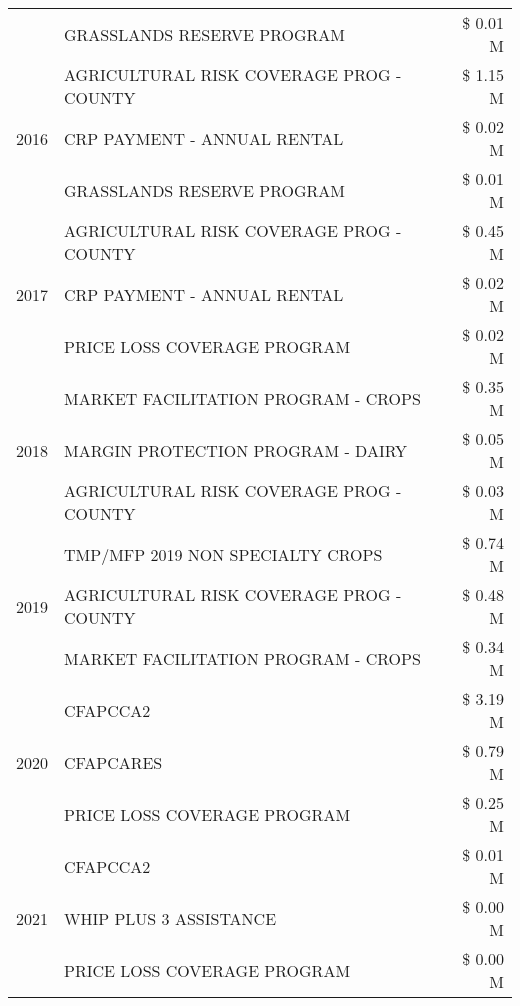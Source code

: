 \begin{tabular}{llr}
 & GRASSLANDS RESERVE PROGRAM & \$ 0.01 M \\
\cline{1-3}
\multirow[t]{3}{*}{2016} & AGRICULTURAL RISK COVERAGE PROG - COUNTY & \$ 1.15 M \\
 & CRP PAYMENT - ANNUAL RENTAL & \$ 0.02 M \\
 & GRASSLANDS RESERVE PROGRAM & \$ 0.01 M \\
\cline{1-3}
\multirow[t]{3}{*}{2017} & AGRICULTURAL RISK COVERAGE PROG - COUNTY & \$ 0.45 M \\
 & CRP PAYMENT - ANNUAL RENTAL & \$ 0.02 M \\
 & PRICE LOSS COVERAGE PROGRAM & \$ 0.02 M \\
\cline{1-3}
\multirow[t]{3}{*}{2018} & MARKET FACILITATION PROGRAM - CROPS & \$ 0.35 M \\
 & MARGIN PROTECTION PROGRAM - DAIRY & \$ 0.05 M \\
 & AGRICULTURAL RISK COVERAGE PROG - COUNTY & \$ 0.03 M \\
\cline{1-3}
\multirow[t]{3}{*}{2019} & TMP/MFP 2019 NON SPECIALTY CROPS & \$ 0.74 M \\
 & AGRICULTURAL RISK COVERAGE PROG - COUNTY & \$ 0.48 M \\
 & MARKET FACILITATION PROGRAM - CROPS & \$ 0.34 M \\
\cline{1-3}
\multirow[t]{3}{*}{2020} & CFAPCCA2 & \$ 3.19 M \\
 & CFAPCARES & \$ 0.79 M \\
 & PRICE LOSS COVERAGE PROGRAM & \$ 0.25 M \\
\cline{1-3}
\multirow[t]{3}{*}{2021} & CFAPCCA2 & \$ 0.01 M \\
 & WHIP PLUS 3 ASSISTANCE & \$ 0.00 M \\
 & PRICE LOSS COVERAGE PROGRAM & \$ 0.00 M \\
\cline{1-3}
\bottomrule
\end{tabular}

